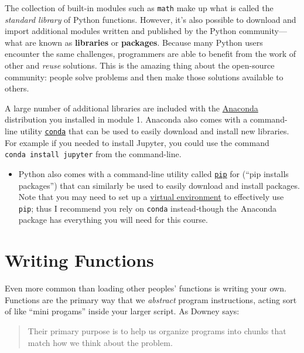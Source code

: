 \documentclass[]{book}
\providecommand{\tightlist}{%
  \setlength{\itemsep}{0pt}\setlength{\parskip}{0pt}}
\begin{document}
The collection of built-in modules such as \texttt{math} make up what is
called the \emph{standard library} of Python functions. However, it's
also possible to download and import additional modules written and
published by the Python community---what are known as \textbf{libraries}
or \textbf{packages}. Because many Python users encounter the same
challenges, programmers are able to benefit from the work of other and
\emph{reuse} solutions. This is the amazing thing about the open-source
community: people solve problems and then make those solutions available
to others.

A large number of additional libraries are included with the
\href{https://www.continuum.io/}{Anaconda} distribution you installed in
module 1. Anaconda also comes with a command-line utility
\href{https://conda.io/docs/}{\texttt{conda}} that can be used to easily
download and install new libraries. For example if you needed to install
Jupyter, you could use the command \texttt{conda\ install\ jupyter} from
the command-line.

\begin{itemize}
\tightlist
\item
  Python also comes with a command-line utility called
  \href{https://pip.pypa.io/en/stable/}{\texttt{pip}} for (``pip
  installs packages'') that can similarly be used to easily download and
  install packages. Note that you may need to set up a
  \href{http://python-guide-pt-br.readthedocs.io/en/latest/dev/virtualenvs/}{virtual
  environment} to effectively use \texttt{pip}; thus I recommend you
  rely on \texttt{conda} instead‐though the Anaconda package has
  everything you will need for this course.
\end{itemize}

\hypertarget{writing-functions}{\section{Writing
Functions}\label{writing-functions}}

Even more common than loading other peoples' functions is writing your
own. Functions are the primary way that we \emph{abstract} program
instructions, acting sort of like ``mini progams'' inside your larger
script. As Downey says:

\begin{quote}
Their primary purpose is to help us organize programs into chunks that
match how we think about the problem.
\end{quote}
\end{document}
